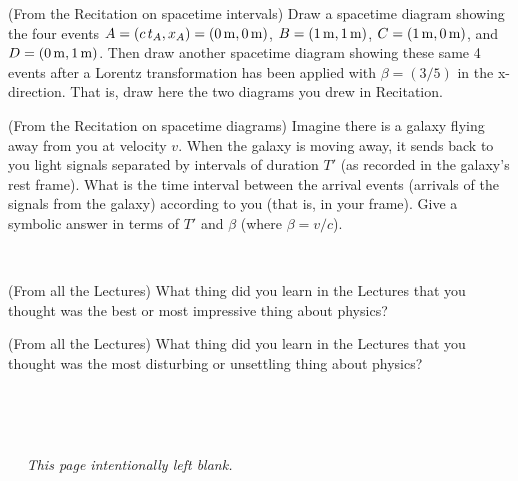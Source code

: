 \documentclass[12pt, letterpaper]{article}
\begin{document}
\vfill

\begin{problem} (From the Recitation on spacetime intervals)
  Draw a spacetime diagram showing the four events
  $A=(c\,t_A,x_A)=(0\,\mathrm{m},0\,\mathrm{m})$, $B=(1\,\mathrm{m},1\,\mathrm{m})$, $C=(1\,\mathrm{m},0\,\mathrm{m})$,
  and $D=(0\,\mathrm{m},1\,\mathrm{m})$.
  Then draw another spacetime diagram showing these same 4 events
  after a Lorentz transformation has been applied with $\beta=(3/5)$ in the x-direction.
  That is, draw here the two diagrams you drew in Recitation.
\end{problem}

\vfill

\begin{problem} (From the Recitation on spacetime diagrams)
  Imagine there is a galaxy flying away from you at velocity $v$.
  When the galaxy is moving away, it sends back to you light
  signals separated by intervals of duration $T'$ (as recorded in the galaxy's rest frame).
  What is the time interval between the arrival events (arrivals of
  the signals from the galaxy) according to you (that is, in your
  frame). Give a symbolic answer in terms of $T'$ and $\beta$ (where $\beta=v/c$).
\end{problem}

\vfill
~\clearpage

\begin{problem} (From all the Lectures)
  What thing did you learn in the Lectures that you thought was the best or most impressive thing about physics?
\end{problem}

\vfill

\begin{problem} (From all the Lectures)
  What thing did you learn in the Lectures that you thought was the most disturbing or unsettling thing about physics?
\end{problem}

\vfill
~

\vfill
~\clearpage

~
\vfill
~\hfill\textsl{This page intentionally left blank.}\hfill~
\vfill
~
\end{document}
